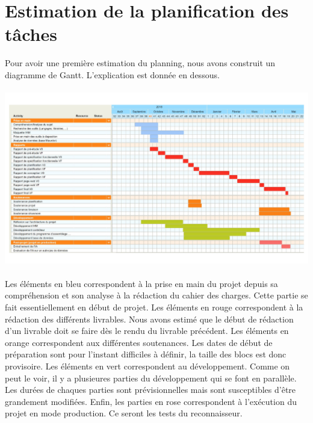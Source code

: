 \section{Estimation de la planification des tâches}

Pour avoir une première estimation du planning, nous avons construit un diagramme de Gantt. L’explication est donnée en dessous.

\paragraph{}
\begin{mdframed}[frametitle={Figure 15 : Estimation de la planification des tâches}, innerbottommargin=10]
\begin{center}
\includegraphics[width=\linewidth]{gantt.pdf}
\end{center}
\end{mdframed}

\paragraph{}
Les éléments en bleu correspondent à la prise en main du projet depuis sa compréhension et son analyse
à la rédaction du cahier des charges. Cette partie se fait essentiellement en début de projet. Les éléments en rouge
correspondent à la rédaction des différents livrables. Nous avons estimé que le début de rédaction d’un livrable
doit se faire dès le rendu du livrable précédent. Les éléments en orange correspondent aux différentes soutenances.
Les dates de début de préparation sont pour l’instant difficiles à définir, la taille des blocs est donc provisoire.
Les éléments en vert correspondent au développement. Comme on peut le voir, il y a plusieures parties du développement
qui se font en parallèle. Les durées de chaques parties sont prévisionnelles mais sont susceptibles d’être grandement modifiées.
Enfin, les parties en rose correspondent à l'exécution du projet en mode production. Ce seront les tests du reconnaisseur.